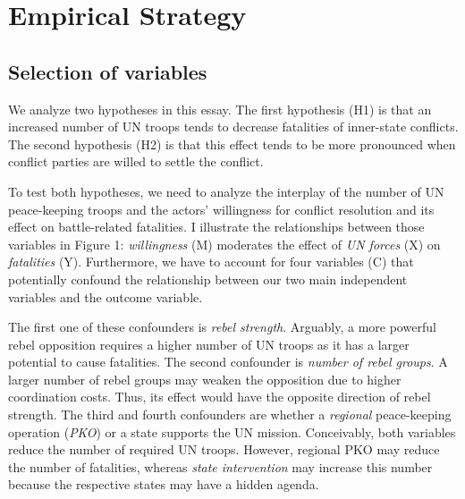\documentclass[12pt,english,a4paper,oneside]{article}
\begin{document}
\newpage







{
\setcounter{tocdepth}{2}
\newpage
{}
\tableofcontents
}

\newpage
{}
\pagestyle{plain}
\hypertarget{empirical-strategy}{%
\section{Empirical Strategy}\label{empirical-strategy}}

\hypertarget{selection-of-variables}{%
\subsection{Selection of variables}\label{selection-of-variables}}

We analyze two hypotheses in this essay. The first hypothesis (H1) is that an increased number of UN troops tends to decrease fatalities of inner-state conflicts. The second hypothesis (H2) is that this effect tends to be more pronounced when conflict parties are willed to settle the conflict.

To test both hypotheses, we need to analyze the interplay of the number of UN peace-keeping troops and the actors' willingness for conflict resolution and its effect on battle-related fatalities. I illustrate the relationships between those variables in Figure 1: \emph{willingness} (M) moderates the effect of \emph{UN forces} (X) on \emph{fatalities} (Y). Furthermore, we have to account for four variables (C) that potentially confound the relationship between our two main independent variables and the outcome variable.

The first one of these confounders is \emph{rebel strength}. Arguably, a more powerful rebel opposition requires a higher number of UN troops as it has a larger potential to cause fatalities. The second confounder is \emph{number of rebel groups}. A larger number of rebel groups may weaken the opposition due to higher coordination costs. Thus, its effect would have the opposite direction of rebel strength. The third and fourth confounders are whether a \emph{regional} peace-keeping operation (\emph{PKO}) or a state supports the UN mission. Conceivably, both variables reduce the number of required UN troops. However, regional PKO may reduce the number of fatalities, whereas \emph{state intervention} may increase this number because the respective states may have a hidden agenda.
\end{document}
